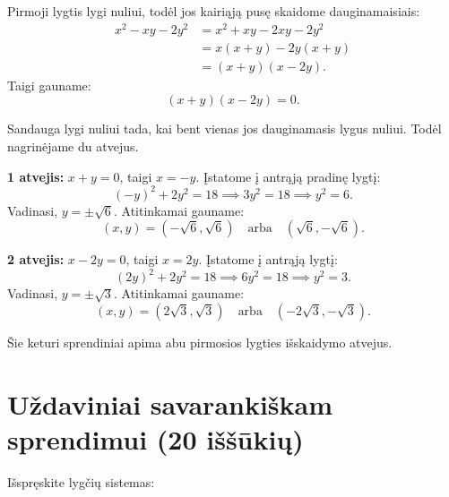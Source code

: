 \documentclass[11pt,a4paper]{scrartcl}
\begin{document}
\begin{solution}
Pirmoji lygtis lygi nuliui, todėl jos kairiąją pusę skaidome dauginamaisiais:
\begin{align*}
x^2-xy-2y^2 &= x^2+xy-2xy-2y^2 \\
             &= x(x+y)-2y(x+y) \\
             &= (x+y)(x-2y).
\end{align*}
Taigi gauname:
\[
(x+y)(x-2y)=0.
\]

Sandauga lygi nuliui tada, kai bent vienas jos dauginamasis lygus nuliui. Todėl nagrinėjame du atvejus.

\textbf{1 atvejis:} $x+y=0$, taigi $x=-y$. Įstatome į antrąją pradinę lygtį:
\[
(-y)^2+2y^2=18 \implies 3y^2=18 \implies y^2=6.
\]
Vadinasi, $y=\pm\sqrt6$. Atitinkamai gauname:
\[
(x,y)=(-\sqrt6,\sqrt6) \quad\text{arba}\quad (\sqrt6,-\sqrt6).
\]

\textbf{2 atvejis:} $x-2y=0$, taigi $x=2y$. Įstatome į antrąją lygtį:
\[
(2y)^2+2y^2=18 \implies 6y^2=18 \implies y^2=3.
\]
Vadinasi, $y=\pm\sqrt3$. Atitinkamai gauname:
\[
(x,y)=(2\sqrt3,\sqrt3) \quad\text{arba}\quad (-2\sqrt3,-\sqrt3).
\]

Šie keturi sprendiniai apima abu pirmosios lygties išskaidymo atvejus.

\end{solution}

\vspace{0.5cm}

\newpage
\section{Uždaviniai savarankiškam sprendimui (20 iššūkių)}
Išspręskite lygčių sistemas:
\end{document}
